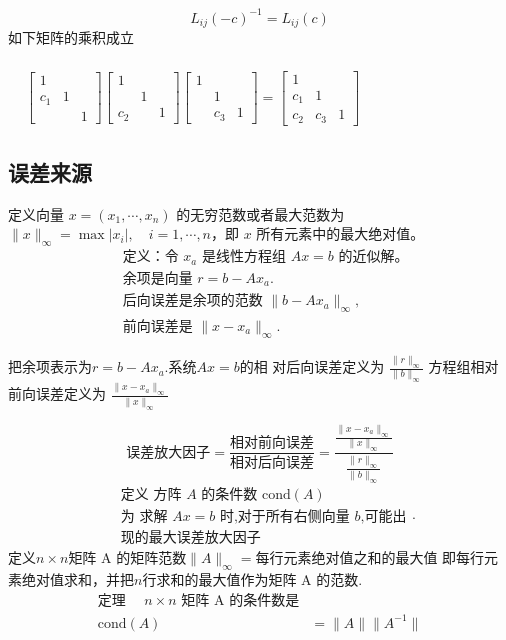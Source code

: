 \documentclass[UTF8,5pt,a4paper]{ctexart} %
\begin{document}
\begin{multicols}{4}
\[
L_{ij}(-c)^{-1} = L_{ij}(c)
\]
如下矩阵的乘积成立

$\begin{aligned}\\&\begin{bmatrix}1&&\\c_1&1&\\&&1\end{bmatrix}\begin{bmatrix}1&&\\&1&\\c_2&&1\end{bmatrix}\begin{bmatrix}1&&\\&1&\\&c_3&1\end{bmatrix}=\begin{bmatrix}1&&\\c_1&1&\\c_2&c_3&1\end{bmatrix}\end{aligned}$
\subsection{误差来源}

定义向量 \( x=(x_1,\cdots,x_n) \) 的无穷范数或者最大范数为 \( \| x \|_\infty = \max |x_i|, \quad i=1,\cdots,n \)，即 \( x \) 所有元素中的最大绝对值。
$$
\begin{aligned}
    & \text{定义：令 } x_a \text{ 是线性方程组 } Ax=b \text{ 的近似解。}\\
    &\text{余项是向量 } r=b-Ax_a. \\
    & \text{后向误差是余项的范数 } \| b - Ax_a \|_\infty, \\
    & \text{前向误差是 } \| x - x_a \|_\infty.
    \end{aligned}$$

    把余项表示为$r=b-Ax_a.$系统$Ax=b$的相
对后向误差定义为
$\frac{\parallel r\parallel_\infty}{\parallel b\parallel_\infty}$
方程组相对前向误差定义为
$\frac{\parallel x-x_a\parallel_\infty}{\parallel x\parallel_\infty}$

$$\text{误差放大因子}=\frac{\text{相对前向误差}}{\text{相对后向误差}}=\frac{\frac{\parallel x-x_a\parallel_\infty}{\parallel x\parallel_\infty}}{\frac{\parallel r\parallel_\infty}{\parallel b\parallel_\infty}}$$
$$\begin{aligned}&\text{定义 方阵 }A\text{ 的条件数 cond}(A)\\
&\text{为 求解 }Ax=b\text{ 时,对于所有右侧向量 }b\text{,可能出}\\
&\text{现的最大误差放大因子}\end{aligned}.$$
定义$n\times n$矩阵 A 的矩阵范数$\parallel A\parallel_{\infty}=$每行元素绝对值之和的最大值
即每行元素绝对值求和，并把$n$行求和的最大值作为矩阵 A 的范数.
$$\begin{aligned}\text{定理 }\quad n\times n\text{ 矩阵 A 的条件数是}\\\mathrm{cond}(A)&=\parallel A\parallel\parallel A^{-1}\parallel\end{aligned}$$

\end{multicols}
\end{document}
